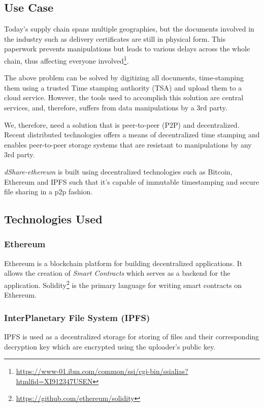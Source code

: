 		\subsection{Use Case}
		Today’s supply chain spans multiple geographies, but the documents involved in the industry such as delivery certificates are still in physical form. This paperwork prevents manipulations but leads to various delays across the whole chain, thus affecting everyone involved\footnote{\url{https://www-01.ibm.com/common/ssi/cgi-bin/ssialias?htmlfid=XI912347USEN}}.
		
		The above problem can be solved by digitizing all documents, time-stamping them using a trusted Time stamping authority (TSA) and upload them to a cloud service. However, the tools used to accomplish this solution are central services, and, therefore, suffers from data manipulations by a 3rd party.
		
		We, therefore, need a solution that is peer-to-peer (P2P) and decentralized. Recent distributed technologies offers a means of decentralized time stamping and enables peer-to-peer storage systems that are resistant to manipulations by any 3rd party.
		
		\textit{dShare-ethereum} is built using decentralized technologies such as Bitcoin\cite{nakamoto2008bitcoin}, Ethereum\cite{buterin2014ethereum} and IPFS\cite{benet2014ipfs} such that it's capable of immutable timestamping and secure file sharing in a p2p fashion.
		
		\subsection{Technologies Used}
			\subsubsection{Ethereum}
			Ethereum\cite{buterin2014ethereum} is a blockchain platform for building decentralized applications. It allows the creation of \textit{Smart Contracts} which serves as a backend for the application. Solidity\footnote{\url{https://github.com/ethereum/solidity}} is the primary language for writing smart contracts on Ethereum.
			
			\subsubsection{InterPlanetary File System (IPFS)}
			IPFS is used as a decentralized storage for storing of files and their corresponding decryption key which are encrypted using the uploader's public key.
			
